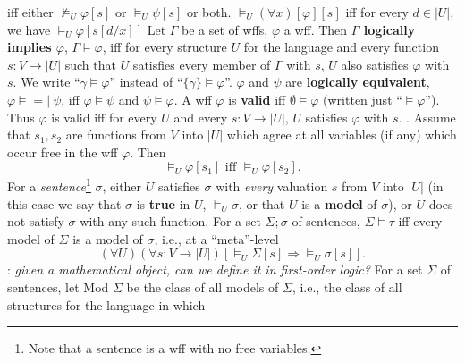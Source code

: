 \documentclass{myproc}
\begin{document}
			iff either $\not\models_U \varphi[s]$ or $\models_U \psi[s]$
			or both.
		\w [3.3] $\models_U (\forall{x})[\varphi][s]$ iff for every
			$d \in |U|$, we have $\models_U \varphi [s[d/x]]$
		\een
	\een
\w Let $\Gamma$ be a set of wffs, $\varphi$ a wff. Then
	{\bf{}$\Gamma$ logically implies $\varphi$}, $\Gamma \models \varphi$,
	iff for every structure $U$ for the language and every function
	$s: V \rightarrow |U|$ such that $U$ satisfies every member of 
	$\Gamma$ with $s$, $U$ also satisfies $\varphi$ with $s$.
	\bit
	\w We write ``$\gamma \models \varphi$'' instead of 
		``$\{\gamma\} \models \varphi$''.
	\w $\varphi$ and $\psi$ are {\bf{}logically equivalent}, 
		$\varphi \models =\!\!\!|\ \psi$, iff
		$\varphi \models \psi$ and $\psi \models \varphi$.
	\eit
\w A wff $\varphi$ is {\bf{}valid} iff $\emptyset \models \varphi$
	(written just ``$\models \varphi$'').
	\bit
	\w Thus $\varphi$ is valid iff for every $U$ and 
		every $s: V \rightarrow
		|U|$, $U$ satisfies $\varphi$ with $s$.
	.
	\eit
\w Assume that $s_1, s_2$ are functions from $V$ into $|U|$ which
	agree at all variables (if any) which occur free in the wff $\varphi$.
	Then
		\[ \models_U \varphi [s_1] \mbox{\ iff\ } \models_U \varphi [s_2]. \]
\w For a {\em{}sentence\/}\footnote{Note that a sentence is
	a wff with no free variables.} $\sigma$, either
	\ben
	\w [(a)] $U$ satisfies $\sigma$ with {\em{}every\/}
		valuation $s$ from $V$ into $|U|$ (in this case
			we say that $\sigma$ is {\bf{}true} in $U$, $\models_U \sigma$,
			or that $U$ is a {\bf{}model} of $\sigma$), or
	\w [(b)] $U$ does not satisfy $\sigma$ with any such function.
	\een
\w For a set $\Sigma; \sigma$ of sentences, $\Sigma \models \tau$ iff
	every model of $\Sigma$ is a model of $\sigma$, i.e., at a ``meta''-level
		\[ (\forall{U})(\forall{s: V \rightarrow |U|})
		[\models_U \Sigma[s] 
		\Rightarrow \models_U \sigma[s]]. \]
	\bit
	: {\em{}given a mathematical object, can we define it
		in first-order logic?}
	\w For a set $\Sigma$ of sentences, let Mod $\Sigma$ be the class 
		of all models
		of $\Sigma$, i.e., the class of all structures for the 
		language in which
\end{document}
